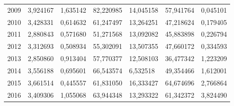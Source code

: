 \begin{table}
\begin{tabular}{p{1cm}p{2cm}p{2cm}p{2cm}p{2cm}p{2cm}p{2cm}}
 2009 &                               3,924167 &                                    1,635142 &            82,220985 &                  14,045158 &                      57,941764 &                            0,045101 \\
 2010 &                               3,428331 &                                    0,614632 &            61,247497 &                  13,264251 &                      47,218624 &                            0,179405 \\
 2011 &                               2,880843 &                                    0,571680 &            51,271568 &                  13,092082 &                      45,883898 &                            0,226794 \\
 2012 &                               3,312693 &                                    0,508934 &            55,302091 &                  13,507355 &                      47,660172 &                            0,334593 \\
 2013 &                               2,850860 &                                    0,913404 &            57,770377 &                  12,508103 &                      36,477342 &                            1,223209 \\
 2014 &                               3,556188 &                                    0,695601 &            66,543574 &                   6,532518 &                      49,354466 &                            1,612001 \\
 2015 &                               3,661514 &                                    0,445557 &            61,831050 &                  16,333427 &                      64,674696 &                            2,766864 \\
 2016 &                               3,409306 &                                    1,055068 &            63,944348 &                  13,293322 &                      61,342372 &                            3,824490 \\
\bottomrule
\end{tabular}
\end{table}
